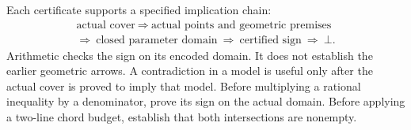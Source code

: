Each certificate supports a specified implication chain:
\[
\begin{gathered}
 \text{actual cover}\ \Longrightarrow\
 \text{actual points and geometric premises}\\
 \Longrightarrow\ \text{closed parameter domain}\
 \Longrightarrow\ \text{certified sign}\ \Longrightarrow\ \bot.
\end{gathered}
\]
Arithmetic checks the sign on its encoded domain. It does not establish
the earlier geometric arrows. A contradiction in a model is useful only
after the actual cover is proved to imply that model.
Before multiplying a rational inequality by a denominator, prove its
sign on the actual domain. Before applying a two-line chord budget,
establish that both intersections are nonempty.

